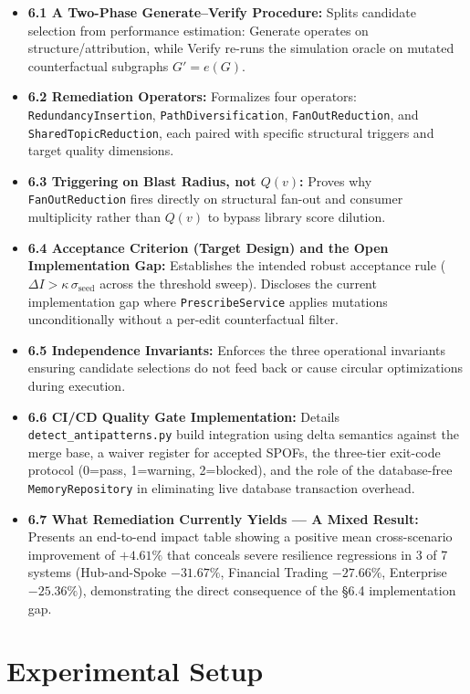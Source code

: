 \documentclass[review]{elsarticle}
\begin{document}
\begin{itemize}[leftmargin=*]
  \item \textbf{6.1 A Two-Phase Generate--Verify Procedure:} Splits candidate selection from performance estimation: Generate operates on structure/attribution, while Verify re-runs the simulation oracle on mutated counterfactual subgraphs $G' = e(G)$.
  \item \textbf{6.2 Remediation Operators:} Formalizes four operators: \texttt{RedundancyInsertion}, \texttt{PathDiversification}, \texttt{FanOutReduction}, and \texttt{SharedTopicReduction}, each paired with specific structural triggers and target quality dimensions.
  \item \textbf{6.3 Triggering on Blast Radius, not $Q(v)$:} Proves why \texttt{FanOutReduction} fires directly on structural fan-out and consumer multiplicity rather than $Q(v)$ to bypass library score dilution.
  \item \textbf{6.4 Acceptance Criterion (Target Design) and the Open Implementation Gap:} Establishes the intended robust acceptance rule ($\Delta I > \kappa\,\sigma_{\text{seed}}$ across the threshold sweep). Discloses the current implementation gap where \texttt{PrescribeService} applies mutations unconditionally without a per-edit counterfactual filter.
  \item \textbf{6.5 Independence Invariants:} Enforces the three operational invariants ensuring candidate selections do not feed back or cause circular optimizations during execution.
  \item \textbf{6.6 CI/CD Quality Gate Implementation:} Details \texttt{detect\_antipatterns.py} build integration using delta semantics against the merge base, a waiver register for accepted SPOFs, the three-tier exit-code protocol (0=pass, 1=warning, 2=blocked), and the role of the database-free \texttt{MemoryRepository} in eliminating live database transaction overhead.
  \item \textbf{6.7 What Remediation Currently Yields --- A Mixed Result:} Presents an end-to-end impact table showing a positive mean cross-scenario improvement of $+4.61\%$ that conceals severe resilience regressions in 3 of 7 systems (Hub-and-Spoke $-31.67\%$, Financial Trading $-27.66\%$, Enterprise $-25.36\%$), demonstrating the direct consequence of the §6.4 implementation gap.
\end{itemize}

\section{Experimental Setup}
\end{document}
